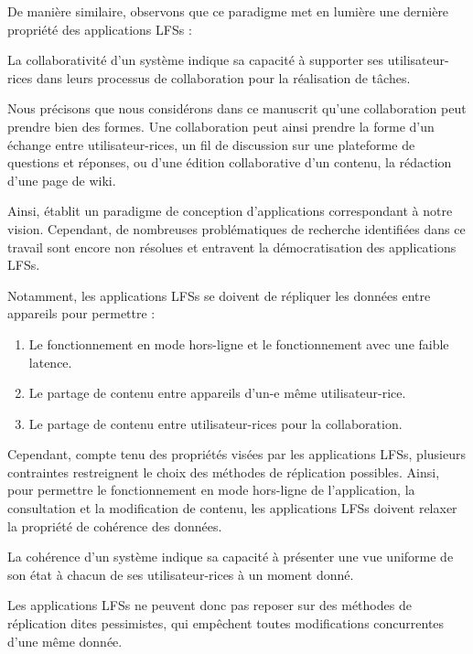De manière similaire, observons que ce paradigme met en lumière une dernière propriété des applications \acp{LFS} :
\begin{definition}[Collaborativité]
  \label{def:collaborative}
  La collaborativité d'un système indique sa capacité à supporter ses utilisateur-rices dans leurs processus de collaboration pour la réalisation de tâches.
\end{definition}
Nous précisons que nous considérons dans ce manuscrit qu'une collaboration peut prendre bien des formes.
Une collaboration peut ainsi prendre la forme d'un échange entre utilisateur-rices, \eg un fil de discussion sur une plateforme de questions et réponses, ou d'une édition collaborative d'un contenu, \eg la rédaction d'une page de wiki.

Ainsi, \cite{localfirstsoftware2019} établit un paradigme de conception d'applications correspondant à notre vision.
Cependant, de nombreuses problématiques de recherche identifiées dans ce travail sont encore non résolues et entravent la démocratisation des applications \acp{LFS}.

Notamment, les applications \acp{LFS} se doivent de répliquer les données entre appareils pour permettre :
\begin{enumerate}
  \item Le fonctionnement en mode hors-ligne et le fonctionnement avec une faible latence.
  \item Le partage de contenu entre appareils d'un-e même utilisateur-rice.
  \item Le partage de contenu entre utilisateur-rices pour la collaboration.
\end{enumerate}

Cependant, compte tenu des propriétés visées par les applications \acp{LFS}, plusieurs contraintes restreignent le choix des méthodes de réplication possibles.
Ainsi, pour permettre le fonctionnement en mode hors-ligne de l'application, \ie la consultation et la modification de contenu, les applications \acp{LFS} doivent relaxer la propriété de cohérence des données.
\begin{definition}[Cohérence]
  La cohérence d'un système indique sa capacité à présenter une vue uniforme de son état à chacun de ses utilisateur-rices à un moment donné.
\end{definition}
Les applications \acp{LFS} ne peuvent donc pas reposer sur des méthodes de réplication dites pessimistes, \ie qui empêchent toutes modifications concurrentes d'une même donnée.

